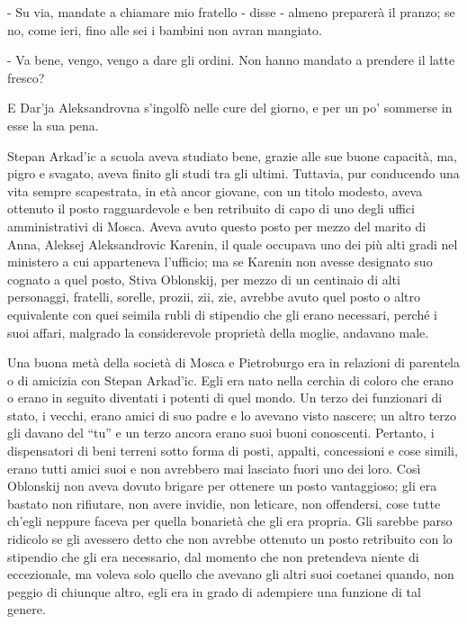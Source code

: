 - Su via, mandate a chiamare mio fratello - disse - almeno preparerà il pranzo; se no, come ieri, fino alle sei i bambini non avran mangiato. 

- Va bene, vengo, vengo a dare gli ordini. Non hanno mandato a prendere il latte fresco? 

E Dar'ja Aleksandrovna s'ingolfò nelle cure del giorno, e per un po' sommerse in esse la sua pena. 

\label{v} 

Stepan Arkad'ic a scuola aveva studiato bene, grazie alle sue buone capacità, ma, pigro e svagato, aveva finito gli studi tra gli ultimi. Tuttavia, pur conducendo una vita sempre scapestrata, in età ancor giovane, con un titolo modesto, aveva ottenuto il posto ragguardevole e ben retribuito di capo di uno degli uffici amministrativi di Mosca. Aveva avuto questo posto per mezzo del marito di Anna, Aleksej Aleksandrovic Karenin, il quale occupava uno dei più alti gradi nel ministero a cui apparteneva l'ufficio; ma se Karenin non avesse designato suo cognato a quel posto, Stiva Oblonskij, per mezzo di un centinaio di alti personaggi, fratelli, sorelle, prozii, zii, zie, avrebbe avuto quel posto o altro equivalente con quei seimila rubli di stipendio che gli erano necessari, perché i suoi affari, malgrado la considerevole proprietà della moglie, andavano male. 

Una buona metà della società di Mosca e Pietroburgo era in relazioni di parentela o di amicizia con Stepan Arkad'ic. Egli era nato nella cerchia di coloro che erano o erano in seguito diventati i potenti di quel mondo. Un terzo dei funzionari di stato, i vecchi, erano amici di suo padre e lo avevano visto nascere; un altro terzo gli davano del ``tu'' e un terzo ancora erano suoi buoni conoscenti. Pertanto, i dispensatori di beni terreni sotto forma di posti, appalti, concessioni e cose simili, erano tutti amici suoi e non avrebbero mai lasciato fuori uno dei loro. Così Oblonskij non aveva dovuto brigare per ottenere un posto vantaggioso; gli era bastato non rifiutare, non avere invidie, non leticare, non offendersi, cose tutte ch'egli neppure faceva per quella bonarietà che gli era propria. Gli sarebbe parso ridicolo se gli avessero detto che non avrebbe ottenuto un posto retribuito con lo stipendio che gli era necessario, dal momento che non pretendeva niente di eccezionale, ma voleva solo quello che avevano gli altri suoi coetanei quando, non peggio di chiunque altro, egli era in grado di adempiere una funzione di tal genere. 

